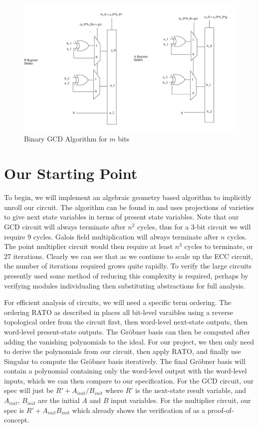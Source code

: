 \documentclass[12pt]{report}
\begin{document}
\begin{figure}
\includegraphics{images/Shift Registers.jpg}
\caption{Binary GCD Algorithm for $m$ bits \cite{Ajay}}
\label{fig:gcd}
\end{figure}

\section{Our Starting Point}

To begin, we will implement an algebraic geometry based algorithm to implicitly unroll our circuit. The algorithm can be found in \cite{Kalla} and uses projections of varieties to give next state variables in terms of present state variables. Note that our GCD circuit will always terminate after $n^2$ cycles, thus for a 3-bit circuit we will require 9 cycles. Galois field multiplication will always terminate after $n$ cycles. The point multiplier circuit would then require at least $n^3$ cycles to terminate, or 27 iterations. Clearly we can see that as we continue to scale up the ECC circuit, the number of iterations required grows quite rapidly. To verify the large circuits presently used some method of reducing this complexity is required, perhaps by verifying modules individualing then substituting abstractions for full analysis. 

For efficient analysis of circuits, we will need a specific term ordering. The ordering RATO as described in \cite{Kalla} places all bit-level varaibles using a reverse topological order from the circuit first, then word-level next-state outputs, then word-level present-state outputs. The Gr{\"o}bner basis can then be computed after adding the vanishing polynomials to the ideal. For our project, we then only need to derive the polynomials from our circuit, then apply RATO, and finally use Singular to compute the Gr{\"o}bner basis iteratively. The final Gr{\"o}bner basis will contain a polynomial containing only the word-level output with the word-level inputs, which we can then compare to our specification. For the GCD circuit, our spec will just be $R' + A_{init}/B_{init}$ where $R'$ is the next-state result variable, and $A_{init}$, $B_{init}$ are the initial $A$ and $B$ input variables. For the multiplier circuit, our spec is $R' + A_{init}B_{init}$ which \cite{Kalla} already shows the verification of as a proof-of-concept. 
\end{document}
